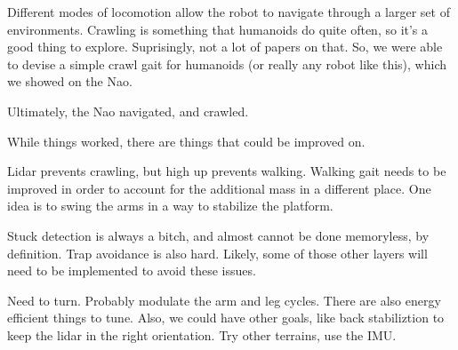 Different modes of locomotion allow the robot to navigate through a larger set
of environments. Crawling is something that humanoids do quite often, so it's
a good thing to explore. Suprisingly, not a lot of papers on that.
So, we were able to devise a simple crawl gait for humanoids
(or really any robot like this), which we showed
on the Nao.

Ultimately, the Nao navigated, and crawled.

While things worked, there are things that could be improved on.

Lidar prevents crawling, but high up prevents walking.
Walking gait needs to be improved in order to account for the additional mass
in a different place. One idea is to swing the arms in a way to stabilize
the platform.

Stuck detection is always a bitch, and almost cannot be done memoryless,
by definition. Trap avoidance is also hard. Likely, some of those other layers
will need to be implemented to avoid these issues.

Need to turn. Probably modulate the arm and leg cycles.
There are also energy efficient things to tune.
Also, we could have other goals, like back stabiliztion to keep the lidar
in the right orientation.
Try other terrains, use the IMU.

